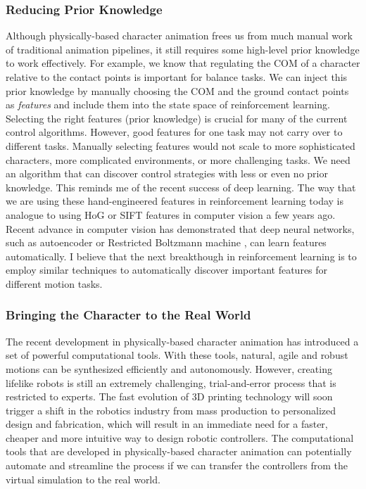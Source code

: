 \subsubsection{Reducing Prior Knowledge}

Although physically-based character animation frees us from much manual work of traditional animation pipelines, it still requires some high-level prior knowledge to work effectively. For example, we know that regulating the COM of a character relative to the contact points is important for balance tasks. We can inject this prior knowledge by manually choosing the COM and the ground contact points as \emph{features} and include them into the state space of reinforcement learning. Selecting the right features (prior knowledge) is crucial for many of the current control algorithms. However, good features for one task may not carry over to different tasks. Manually selecting features would not scale to more sophisticated characters, more complicated environments, or more challenging tasks. We need an algorithm that can discover control strategies with less or even no prior knowledge. This reminds me of the recent success of deep learning. The way that we are using these hand-engineered features in reinforcement learning today is analogue to using HoG or SIFT features in computer vision a few years ago. Recent advance in computer vision has demonstrated that deep neural networks, such as autoencoder \cite{Vincent:2008} or Restricted Boltzmann machine \cite{Hinton:2012}, can learn features automatically. I believe that the next breakthough in reinforcement learning is to employ similar techniques to automatically discover important features for different motion tasks.

\subsubsection{Bringing the Character to the Real World}

The recent development in physically-based character animation has introduced a set of powerful computational tools. With these tools, natural, agile and robust motions can be synthesized efficiently and autonomously. However, creating lifelike robots is still an extremely challenging, trial-and-error process that is restricted to experts. The fast evolution of 3D printing technology will soon trigger a shift in the robotics industry from mass production to personalized design and fabrication, which will result in an immediate need for a faster, cheaper and more intuitive way to design robotic controllers. The computational tools that are developed in physically-based character animation can potentially automate and streamline the process if we can transfer the controllers from the virtual simulation to the real world. 

